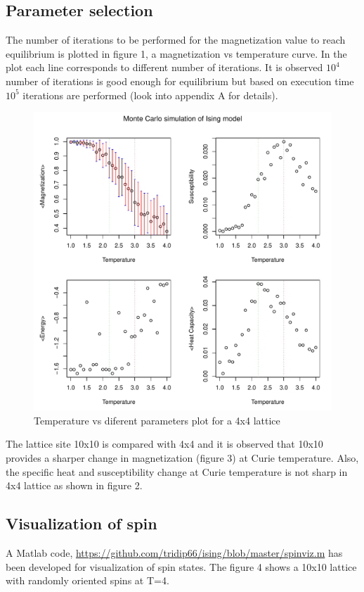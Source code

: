 \documentclass[]{article}
\begin{document}
\subsection{Parameter selection}
The number of iterations to be performed for the magnetization value to reach equilibrium is plotted in figure 1, a magnetization vs temperature curve. In the plot each line corresponds to different number of iterations. It is observed $10^4$ number of iterations is good enough for equilibrium but based on execution time $10^5$ iterations are performed (look into appendix A for details).
\\
\begin{figure}[p]
  \includegraphics[scale=0.8]{figures/fig_4}%
  \caption{\label{fig:epsart} Temperature vs diferent parameters plot for a 4x4 lattice}
\end{figure}

The lattice site 10x10 is compared with 4x4 and it is observed that 10x10 provides a sharper change in magnetization (figure 3) at Curie temperature. Also, the specific heat and susceptibility change at Curie temperature is not sharp in 4x4 lattice as shown in figure 2.


\subsection{Visualization of spin}
A Matlab code, \url{https://github.com/tridip66/ising/blob/master/spinviz.m} has been developed for visualization of spin states. The figure 4 shows a 10x10 lattice with randomly oriented spins at T=4.
\\
\end{document}
